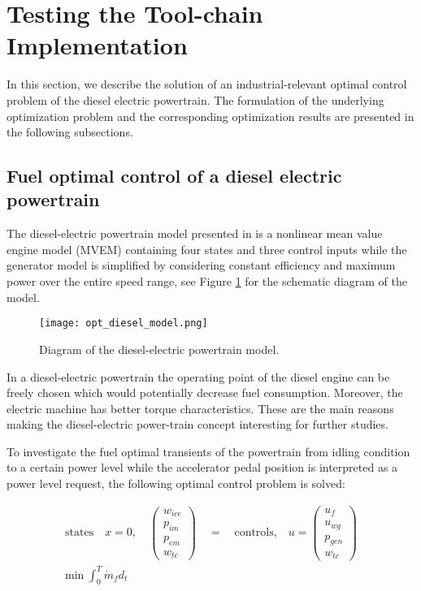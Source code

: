 \section{Testing the Tool-chain Implementation}
\label{sec:optimizationtesting}

In this section, we describe the solution of an industrial-relevant optimal control problem of the diesel electric powertrain. The
formulation of the underlying optimization problem and the corresponding optimization results are presented in the
following subsections.

\subsection{Fuel optimal control of a diesel electric powertrain}
\label{sec:optimizationdiesel}

The diesel-electric powertrain model presented in \cite{sivertsson,bernhard} is a nonlinear
mean value engine model (MVEM) containing four states and three control inputs while the generator model is
simplified by considering constant efficiency and maximum power over the entire speed range, see Figure \ref{fig:dieselmodel} for the
schematic diagram of the model.

\begin{figure}
	\texttt{[image: opt\_diesel\_model.png]}
	\caption{Diagram of the diesel-electric powertrain model.}
	\label{fig:dieselmodel}
\end{figure}

In a diesel-electric powertrain the operating point of the diesel engine can be freely chosen which would potentially
decrease fuel consumption. Moreover, the electric machine has better torque characteristics. These are the main reasons
making the diesel-electric power-train concept interesting for further studies.

To investigate the fuel optimal transients of the powertrain from idling condition to a certain power level while the
accelerator pedal position is interpreted as a power level request, the following optimal control problem is solved:

\begin{equation*}
 \begin{aligned}
	\text{states}\quad x = 0, \quad \begin{pmatrix} w_{ice} \\ p_{im} \\p_{em} \\w_{tc}  \end{pmatrix}\quad = \quad \text{controls,}\quad u = \begin{pmatrix} u_{f} \\ u_{wg} \\p_{gen} \\w_{tc}  \end{pmatrix} \\
	\text{min}\;\int_{0}^{T}\dot{m}{_f} d_t
\end{aligned}
\end{equation*}

